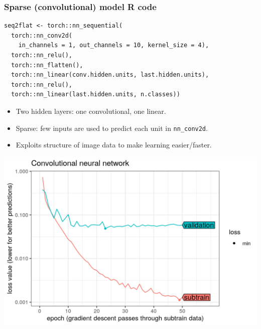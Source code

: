 \documentclass{beamer}
\begin{document}
\begin{frame}[fragile]
  \frametitle{Sparse (convolutional) model R code}

\begin{verbatim}
seq2flat <- torch::nn_sequential(
  torch::nn_conv2d(
    in_channels = 1, out_channels = 10, kernel_size = 4),
  torch::nn_relu(),
  torch::nn_flatten(),
  torch::nn_linear(conv.hidden.units, last.hidden.units),
  torch::nn_relu(),
  torch::nn_linear(last.hidden.units, n.classes))
\end{verbatim}

  \begin{itemize}
  \item Two hidden layers: one convolutional, one linear.
  \item Sparse: few inputs are used to predict each unit in
    \texttt{nn\_conv2d}.
  \item Exploits structure of image data to make learning
    easier/faster.
  \end{itemize}

\end{frame}
 
\begin{frame}
  \includegraphics[width=\textwidth]{figure-validation-loss-conv}
\end{frame}
 
\end{document}
